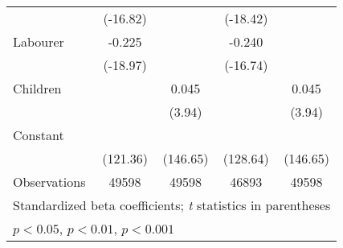 {\begin{tabular}{l*{4}{c}}
                    &    (-16.82)         &                     &    (-18.42)         &                     \\
[1em]
Labourer            &      -0.225\sym{***}&                     &      -0.240\sym{***}&                     \\
                    &    (-18.97)         &                     &    (-16.74)         &                     \\
[1em]
Children            &                     &       0.045\sym{***}&                     &       0.045\sym{***}\\
                    &                     &      (3.94)         &                     &      (3.94)         \\
[1em]
Constant            &            \sym{***}&            \sym{***}&            \sym{***}&            \sym{***}\\
                    &    (121.36)         &    (146.65)         &    (128.64)         &    (146.65)         \\
\hline
Observations        &       49598         &       49598         &       46893         &       49598         \\
\hline\hline
\multicolumn{5}{l}{\footnotesize Standardized beta coefficients; \textit{t} statistics in parentheses}\\
\multicolumn{5}{l}{\footnotesize \sym{*} \(p<0.05\), \sym{**} \(p<0.01\), \sym{***} \(p<0.001\)}\\
\end{tabular}
}
